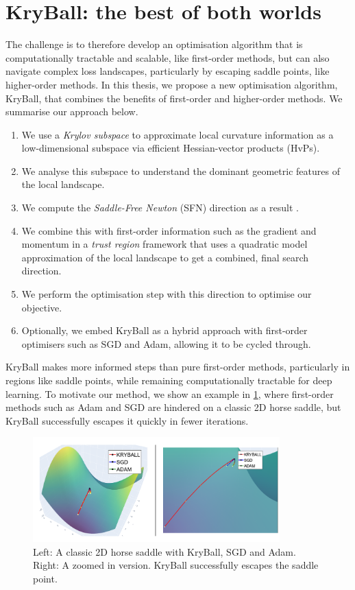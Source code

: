 \section{KryBall: the best of both worlds}
\label{sec:kryball_intro}

The challenge is to therefore develop an optimisation algorithm that is computationally tractable and scalable, like first-order methods, but can also navigate complex loss landscapes, particularly by escaping saddle points, like higher-order methods. In this thesis, we propose a new optimisation algorithm, KryBall, that combines the benefits of first-order and higher-order methods. We summarise our approach below.

\begin{enumerate}
  \item We use a \textit{Krylov subspace} to approximate local curvature information as a low-dimensional subspace via efficient Hessian-vector products (HvPs).
  \item We analyse this subspace to understand the dominant geometric features of the local landscape. 
  \item We compute the \textit{Saddle-Free Newton} (SFN) direction as a result \citep{dauphin2014sfn}.
  \item We combine this with first-order information such as the gradient and momentum in a \textit{trust region} framework that uses a quadratic model approximation of the local landscape to get a combined, final search direction.
  \item We perform the optimisation step with this direction to optimise our objective.
  \item Optionally, we embed KryBall as a hybrid approach with first-order optimisers such as SGD and Adam, allowing it to be cycled through.
\end{enumerate}

KryBall makes more informed steps than pure first-order methods, particularly in regions like saddle points, while remaining computationally tractable for deep learning. To motivate our method, we show an example in \cref{fig:toy_example}, where first-order methods such as Adam and SGD are hindered on a classic 2D horse saddle, but KryBall successfully escapes it quickly in fewer iterations.

\begin{figure}[h]
  \centering
    \includegraphics[width=0.85\textwidth]{figures/0intro/intro_toy.png}
    \caption{Left: A classic 2D horse saddle with KryBall, SGD and Adam. Right: A zoomed in version. KryBall successfully escapes the saddle point.}
    \label{fig:toy_example}
\end{figure}


